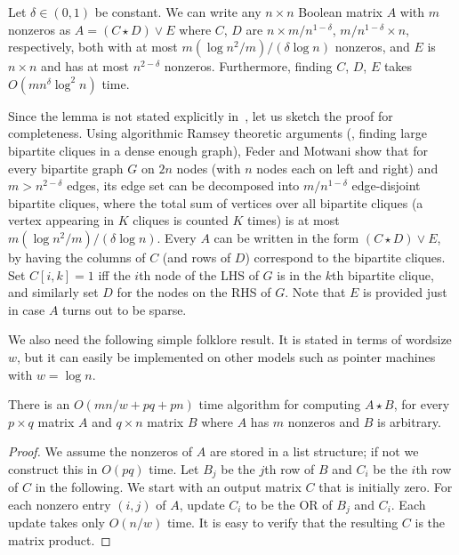 \begin{lemma}\label{sparseramsey} Let $\delta \in (0,1)$ be constant. We can write any $n \times n$ Boolean matrix $A$ with $m$ nonzeros as $A = (C \star D) \vee E$ where $C$, $D$ are $n \times m/n^{1-\delta}$, $m/n^{1-\delta} \times n$, respectively, both with at most $m (\log n^2/m)/(\delta \log n)$ nonzeros, and $E$ is $n \times n$ and has at most $n^{2-\delta}$ nonzeros. Furthermore, finding $C$, $D$, $E$ takes $O(mn^{\delta}\log^2 n)$ time.\end{lemma}

Since the lemma is not stated explicitly in~\cite{federmotwani}, let us sketch the proof for completeness. Using algorithmic Ramsey theoretic arguments (\ie, finding large bipartite cliques in a dense enough graph), Feder and Motwani show that for every bipartite graph $G$ on $2n$ nodes (with $n$ nodes each on left and right) and $m>n^{2-\delta}$ edges, its edge set can be decomposed into $m/n^{1-\delta}$ edge-disjoint bipartite cliques, where the total sum of vertices over all bipartite cliques (a vertex appearing in $K$ cliques is counted $K$ times) is at most $m (\log n^2/m)/(\delta \log n)$. Every $A$ can be written in the form $(C \star D) \vee E$, by having the columns of $C$ (and rows of $D$) correspond to the bipartite cliques. Set $C[i,k]=1$ iff the $i$th node of the LHS of $G$ is in the $k$th bipartite clique, and similarly set $D$ for the nodes on the RHS of $G$. Note that  $E$ is provided just in case $A$ turns out to be sparse.

We also need the following simple folklore result. It is stated in terms of wordsize $w$, but it can easily be implemented on other models such as pointer machines with $w=\log n$.

\begin{lemma}[Folklore]\label{sparseword} There is an $O(m n/w + pq + pn)$ time algorithm for computing $A \star B$, for every $p \times q$ matrix $A$ and $q \times n$  matrix $B$ where $A$ has $m$ nonzeros and $B$ is arbitrary.\end{lemma}

\begin{proof} We assume the nonzeros of $A$ are stored in a list structure; if not we construct this in $O(pq)$ time. Let $B_j$ be the $j$th row of $B$ and $C_i$ be the $i$th row of $C$ in the following. We start with an output matrix $C$ that is initially zero. For each nonzero entry $(i,j)$ of $A$, update $C_i$ to be the OR of $B_j$ and $C_i$. Each update takes only $O(n/w)$ time. It is easy to verify that the resulting $C$ is the matrix product.\end{proof}

